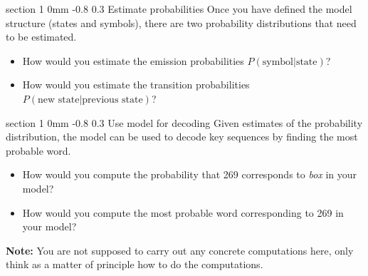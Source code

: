 \documentclass[11pt]{article}
\makeatletter
\newcommand{\newsec}[2]{\section{#1}\label{sec:#2}\noindent}
\renewcommand{\section}{\@startsection
{section}%
{1}%
{0mm}%
{-0.8\baselineskip}%
{0.3\baselineskip}%
{\bfseries\large}}%
\makeatother
\begin{document}
\newsec{Estimate probabilities}{estimate}%
Once you have defined the model structure (states and symbols), there
are two probability distributions that need to be estimated.
\begin{itemize}[noitemsep,topsep=0.2cm]
\item How would you estimate the emission probabilities
  $P(\mbox{symbol}|\mbox{state})$?
\item How would you estimate the transition probabilities
  $P(\mbox{new state}|\mbox{previous state})$?
\end{itemize}

\newsec{Use model for decoding}{decode}%
Given estimates of the probability distribution, the model can be used
to decode key sequences by finding the most probable word.
\begin{itemize}[noitemsep,topsep=0.2cm]
\item How would you compute the probability that 269 corresponds to
  {\em box} in your model?
\item How would you compute the most probable word corresponding to
  269 in your model?
\end{itemize}
\textbf{Note:} You are not supposed to carry out any concrete
computations here, only think as a matter of principle how to do the
computations.

\end{document}
